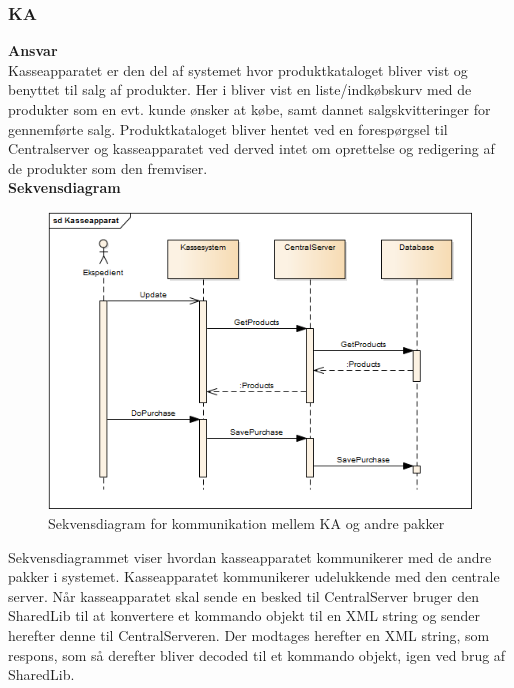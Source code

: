 \subsubsection{\gls{KA}}

\textbf{Ansvar} \\
Kasseapparatet er den del af systemet hvor produktkataloget bliver vist og benyttet til salg af produkter. Her i bliver vist en liste/indkøbskurv med de produkter som en evt. kunde ønsker at købe, samt dannet salgskvitteringer for gennemførte salg. Produktkataloget bliver hentet ved en forespørgsel til Centralserver og kasseapparatet ved derved intet om oprettelse og redigering af de produkter som den fremviser. \\

\textbf{Sekvensdiagram}
\begin{figure}[H]
	\centering
	\includegraphics[scale=0.7]{Systemarkitektur/LogiskView/Kasseapparat-sekvensdiagram}
	\caption{Sekvensdiagram for kommunikation mellem \gls{KA} og andre pakker}
	\label{fig:logview_kasse_sekvensdiagram}
\end{figure}

Sekvensdiagrammet viser hvordan kasseapparatet kommunikerer med de andre pakker i systemet. Kasseapparatet kommunikerer udelukkende med den centrale server. Når kasseapparatet skal sende en besked til CentralServer bruger den SharedLib til at konvertere et kommando objekt til en XML string og sender herefter denne til CentralServeren. Der modtages herefter en XML string, som respons, som så derefter bliver decoded til et kommando objekt, igen ved brug af SharedLib.

\newpage
